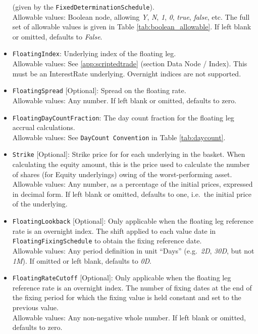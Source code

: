 \begin{itemize}
  (given by the \lstinline!FixedDeterminationSchedule!). \\
    Allowable values: Boolean node, allowing \emph{Y}, \emph{N}, \emph{1}, \emph{0},
    \emph{true}, \emph{false}, etc. The full set of allowable values is given in Table
    \ref{tab:boolean_allowable}. If left blank or omitted, defaults to \emph{False}.
  \item \lstinline!FloatingIndex!: Underlying index of the floating leg. \\
    Allowable values: See \ref{app:scriptedtrade} (section Data Node / Index). This must
    be an InterestRate underlying. Overnight indices are not supported.
  \item \lstinline!FloatingSpread! [Optional]: Spread on the floating rate. \\
    Allowable values: Any number. If left blank or omitted, defaults to zero.
  \item \lstinline!FloatingDayCountFraction!: The day count fraction for the floating leg
  accrual calculations. \\
    Allowable values: See \lstinline!DayCount Convention! in Table \ref{tab:daycount}.
  \item \lstinline!Strike! [Optional]: Strike price for for each underlying in the basket.
  When calculating the equity amount, this is the price used to calculate the number of
  shares (for Equity underlyings) owing of the worst-performing asset. \\
    Allowable values: Any number, as a percentage of the initial prices, expressed in decimal
    form. If left blank or omitted, defaults to one, i.e.\ the initial price of the
    underlying.
  \item \lstinline!FloatingLookback! [Optional]: Only applicable when the floating leg reference
  rate is an overnight index. The shift applied to each value date in \lstinline!FloatingFixingSchedule!
  to obtain the fixing reference date. \\
    Allowable values: Any period definition in unit ``Days'' (e.g.\ \emph{2D}, \emph{30D}, but not \emph{1M}).
    If omitted or left blank, defaults to \emph{0D}.
  \item \lstinline!FloatingRateCutoff! [Optional]: Only applicable when the floating leg reference
  rate is an overnight index. The number of fixing dates at the end of the fixing period for which
  the fixing value is held constant and set to the previous value. \\
    Allowable values: Any non-negative whole number. If left blank or omitted, defaults to zero.

\end{itemize}
